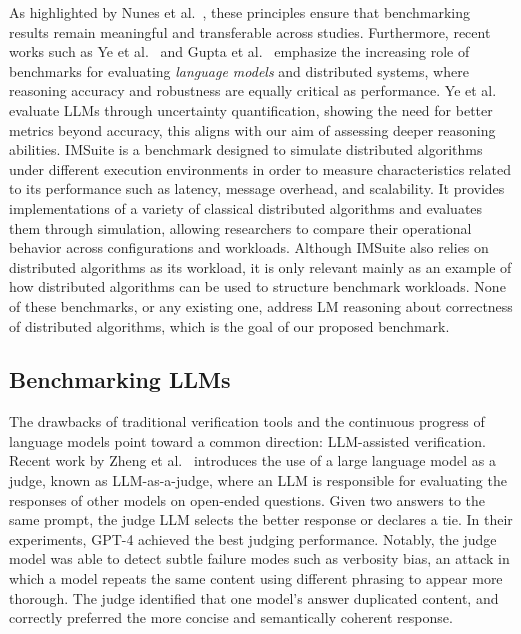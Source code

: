As highlighted by Nunes et al.~\cite{nunes2018benchmarking}, these principles ensure that benchmarking results remain meaningful and transferable across studies. 
Furthermore, recent works such as Ye et al.~\cite{ye2024uncertainty} and Gupta et al.~\cite{gupta2023imsuite} emphasize the increasing role of benchmarks for evaluating \textit{language models} and distributed systems, where reasoning accuracy and robustness are equally critical as performance. Ye et al.\cite{ye2024uncertainty} evaluate LLMs through uncertainty quantification, showing the need for better metrics beyond accuracy, this aligns with our aim of assessing deeper reasoning abilities. IMSuite \cite{gupta2023imsuite} is a benchmark designed to simulate distributed algorithms under different execution environments in order to measure characteristics related to its performance such as latency, message overhead, and scalability. It provides implementations of a variety of classical distributed algorithms and evaluates them through simulation, allowing researchers to compare their operational behavior across configurations and workloads. Although IMSuite also relies on distributed algorithms as its workload, it is only relevant mainly as an example of how distributed algorithms can be used to structure benchmark workloads. None of these benchmarks, or any existing one, address LM reasoning about correctness of distributed algorithms, which is the goal of our proposed benchmark.

\subsection{Benchmarking LLMs}
The drawbacks of traditional verification tools and the continuous progress of language models point toward a common direction: LLM-assisted verification. Recent work by Zheng et al.~\cite{NEURIPS2023_91f18a12} introduces the use of a large language model as a judge, known as LLM-as-a-judge, where an LLM is responsible for evaluating the responses of other models on open-ended questions. Given two answers to the same prompt, the judge LLM selects the better response or declares a tie. In their experiments, GPT-4 achieved the best judging performance. Notably, the judge model was able to detect subtle failure modes such as verbosity bias, an attack in which a model repeats the same content using different phrasing to appear more thorough. The judge identified that one model’s answer duplicated content, and correctly preferred the more concise and semantically coherent response.

